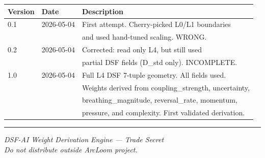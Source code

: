 \documentclass[11pt,a4paper]{article}
\begin{document}
\begin{center}
\begin{tabular}{@{}lll@{}}
\toprule
\textbf{Version} & \textbf{Date} & \textbf{Description} \\
\midrule
0.1 & 2026-05-04 & First attempt. Cherry-picked L0/L1 boundaries \\
    &            & and used hand-tuned scaling. WRONG. \\
0.2 & 2026-05-04 & Corrected: read only L4, but still used \\
    &            & partial DSF fields (D\_std only). INCOMPLETE. \\
1.0 & 2026-05-04 & Full L4 DSF 7-tuple geometry. All fields used. \\
    &            & Weights derived from coupling\_strength, uncertainty, \\
    &            & breathing\_magnitude, reversal\_rate, momentum, \\
    &            & pressure, and complexity. First validated derivation. \\
\bottomrule
\end{tabular}
\end{center}

\vspace{2em}
\noindent\rule{\textwidth}{0.4pt}
\begin{center}
\small\textit{DSF-AI Weight Derivation Engine --- Trade Secret}\\
\small\textit{Do not distribute outside ArcLoom project.}
\end{center}
\end{document}
